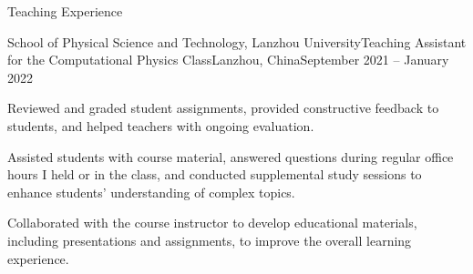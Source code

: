 \documentclass[]{kyvernitis-resume}
\begin{document}
\begin{section}{\Large Teaching Experience}
    \begin{subsection}{School of Physical Science and Technology, Lanzhou University}{Teaching Assistant for the Computational Physics Class}{Lanzhou, China}{September 2021 -- January 2022}
    \item Reviewed and graded student assignments, provided constructive feedback to students, and helped teachers with ongoing evaluation.
    \item Assisted students with course material, answered questions during regular office hours I held or in the class, and conducted supplemental study sessions to enhance students' understanding of complex topics.
      \item Collaborated with the course instructor to develop educational materials, including presentations and assignments, to improve the overall learning experience.
    \end{subsection}
\end{section}






\end{document}
